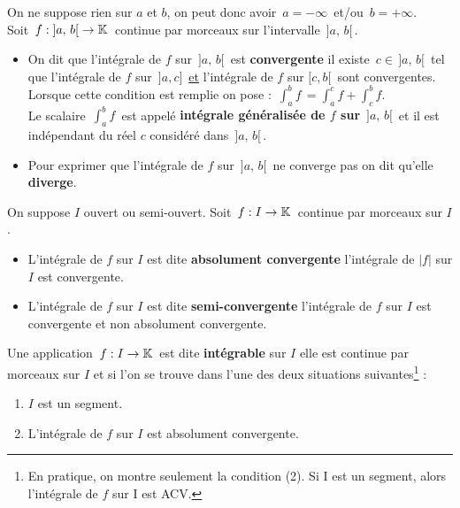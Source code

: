 On ne suppose rien sur $a$ et $b$, on peut donc avoir \(\,a=-\infty\,\) et/ou \(\,b=+\infty\).\vspace{0.2cm}\\
Soit \(\,f:\;]a,\,b[\;\to\mathbb{K}\,\) continue par morceaux sur l'intervalle \(\,]a,\,b[\,\).
\begin{itemize}[leftmargin=0.5cm, label=•]
    \item On dit que l'intégrale de $f$ sur \(\,]a,\,b[\,\) est \textbf{convergente} \ssi il existe \(\,c\in\,]a,\,b[\,\) tel que l'intégrale de $f$ sur \(\,]a,c]\,\) \underline{et} l'intégrale de $f$ sur \([c, b[\,\) sont convergentes.\vspace{0.1cm}\\
    Lorsque cette condition est remplie on pose : \(\,\displaystyle \int_{a}^{b}\!f\,=\int_{a}^{c}\!f+\int_{c}^{b}\!f.\)\vspace{0.1cm}\\
    Le scalaire \(\,\displaystyle\int_{a}^{b}\!f\,\) est appelé \textbf{intégrale généralisée de $f$ sur} \(\,]a,\,b[\,\) et il est indépendant du réel $c$ considéré dans \(\,]a,\,b[\,\).\vspace{0.4cm}

    \item Pour exprimer que l'intégrale de $f$ sur \(\,]a,\,b[\,\) ne converge pas on dit qu'elle \textbf{diverge}.
\end{itemize}

\newpage

\noindent On suppose $I$ ouvert ou semi-ouvert. Soit \(\,f:I\to\mathbb{K}\,\) continue par morceaux sur $I$.
\begin{itemize}[label=•]
    \item L'intégrale de $f$ sur $I$ est dite \textbf{absolument convergente} \ssi l'intégrale de $|f|$ sur $I$ est convergente.
    
    \item L'intégrale de $f$ sur $I$ est dite \textbf{semi-convergente} \ssi l'intégrale de $f$ sur $I$ est convergente et non absolument convergente.
\end{itemize}

\vspace{1.5cm}

Une application \(\,f:I\to\mathbb{K}\,\) est dite \textbf{intégrable} sur $I$ \ssi elle est continue par morceaux sur $I$ et si l'on se trouve dans l'une des deux situations suivantes\footnote{En pratique, on montre seulement la condition (2). Si I est un segment, alors l'intégrale de $f$ sur I est ACV.} :
\begin{enumerate}[leftmargin=6cm,label=(\arabic*)\;]
    \item $I$ est un segment.
    
    \item L'intégrale de $f$ sur $I$ est absolument convergente.
\end{enumerate}
\vspace{0.3cm}

